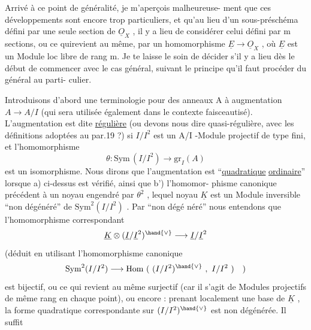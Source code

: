 
Arrivé à ce point  de généralité, je m'aperçois malheureuse-%
ment que ces développements sont encore trop particuliers, et qu'au lieu
d'un sous-préschéma défini par une seule section de $\underline{O}_X$ , il y a lieu de
considérer celui défini par m sections, ou ce qui\hand{/}revient au même, par un
homomorphisme $\underline{E} \longrightarrow \underline{O}_X$ , où $\underline{E}$ est un Module loc libre de rang m. Je te
laisse le soin de décider s'il y a lieu dès le début de commencer avec le
cas général, suivant le principe qu'il faut procéder du général au parti-%
culier.

Introduisons d'abord une terminologie pour des anneaux A à
augmentation $A \to A/I$ (qui sera utilisée également dans le contexte
faisceautisé). L'augmentation est dite \uline{régulière} (ou devons nous dire
quasi-régulière, avec les définitions adoptées au par.19 ?) si  $I/I^2$ est
un A/I -Module projectif de type fini, et  l'homomorphisme
\[ \theta\colon \mathrm{Sym}\,(I/I^2) \longrightarrow \mathrm{gr}_I(A) \]
est un isomorphisme. Nous dirons que l'augmentation est  ``\uline{quadratique}
\uline{ordinaire}'' lorsque a) ci-dessus est vérifié, ainsi que b') l'homomor-%
phisme canonique précédent à un noyau engendré par $\theta^2$ , lequel noyau $\underline{K}$
est un Module inversible ``non dégénéré'' de $\mathrm{Sym}^2(I/I^2)$ . Par ``non dégé%
néré'' nous entendons que l'homomorphisme correspondant
\[ \underline{K} \otimes (\underline{I}/\underline{I}^2)^{\hand{\vee}} \longrightarrow \underline{I}/\underline{I}^2 \]
(déduit en utilisant l'homomorphisme canonique
\[ \mathrm{Sym}^2(I/I^2) \longrightarrow \mathrm{Hom}\ (\ (I/I^2)^{\hand{\vee}}\ ,\ I/I^2\ )\quad ) \]
est bijectif, ou ce qui revient au même surjectif (car il s'agit de
Modules projectifs  de même rang en chaque point), ou encore : prenant
localement une base  de $\underline{K}$ ,  la forme
quadratique correspondante sur $(I/I^2)^{\hand{\vee}}$ est non dégénérée. Il suffit

